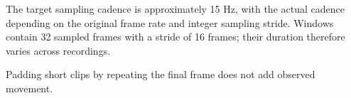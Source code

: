 The target sampling cadence is approximately 15 Hz, with the actual cadence depending on the original frame rate and integer sampling stride. Windows contain 32 sampled frames with a stride of 16 frames; their duration therefore varies across recordings.

Padding short clips by repeating the final frame does not add observed movement.
